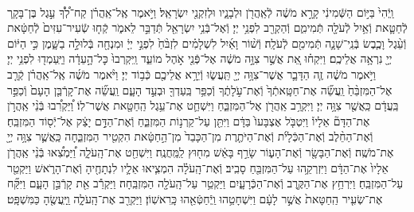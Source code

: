 \documentclass[twoside, openany, parskip=half, 11pt]{book}
\begin{document}
\begin{footnotesize}
\begin{multicols}{2}
\\
וַֽיְֿהִי֙ בַּיּ֣וֹם הַשְּֿׁמִינִ֔י קָרָ֣א מֹשֶׁ֔ה לְֿאַֽהֲרֹ֖ן וּלְבָנָ֑יו וּלְזִקְנֵ֖י יִשְׂרָאֵֽל׃ וַיֹּ֣אמֶר אֶֽל־אַֽהֲרֹ֗ן קַח־לְ֠ךָ֠ עֵ֣גֶל בֶּן־בָּקָ֧ר לְֿחַטָּ֛את וְֿאַ֥יִל לְֿעֹלָ֖ה תְּֿמִימִ֑ם וְֿהַקְרֵ֖ב לִפְנֵ֥י יְיָ׃ וְֿאֶל־בְּֿנֵ֥י יִשְׂרָאֵ֖ל תְּֿדַבֵּ֣ר לֵאמֹ֑ר קְֿח֤וּ שְֿׂעִיר־עִזִּים֙ לְֿחַטָּ֔את וְֿעֵ֨גֶל וָכֶ֧בֶשׂ בְּֿנֵֽי־שָׁנָ֛ה תְּֿמִימִ֖ם לְֿעֹלָֽה׃ וְֿשׁ֨וֹר וָאַ֜יִל לִשְׁלָמִ֗ים לִזְבֹּ֨חַ֙ לִפְנֵ֣י יְיָ֔ וּמִנְחָ֖ה בְּֿלוּלָ֣ה בַשָּׁ֑מֶן כִּ֣י הַיּ֔וֹם יְיָ֖ נִרְאָ֥ה אֲלֵיכֶֽם׃ וַיִּקְח֗וּ אֵ֚ת אֲשֶׁ֣ר צִוָּ֣ה מֹשֶׁ֔ה אֶל־פְּֿנֵ֖י אֹ֣הֶל מוֹעֵ֑ד וַֽיִּקְרְבוּ֙ כׇּל־הָ֣עֵדָ֔ה וַיַּֽעַמְד֖וּ לִפְנֵ֥י יְיָ׃ וַיֹּ֣אמֶר מֹשֶׁ֔ה זֶ֧ה הַדָּבָ֛ר אֲשֶׁר־צִוָּ֥ה יְיָ֖ תַּֽעֲשׂ֑וּ וְֿיֵרָ֥א אֲלֵיכֶ֖ם כְּֿב֥וֹד יְיָ׃  וַיֹּ֨אמֶר מֹשֶׁ֜ה אֶֽל־אַֽהֲרֹ֗ן קְֿרַ֤ב אֶל־הַמִּזְבֵּ֨חַ֙ וַֽעֲשֵׂ֞ה אֶת־חַטָּֽאתְֿךָ֙ וְֿאֶת־עֹ֣לָתֶ֔ךָ וְֿכַפֵּ֥ר בַּֽעַדְךָ֖ וּבְעַ֣ד הָעָ֑ם וַֽעֲשֵׂ֞ה אֶת־קָרְֿבַּ֤ן הָעָם֙ וְֿכַפֵּ֣ר בַּֽעֲדָ֔ם כַּֽאֲשֶׁ֖ר צִוָּ֥ה יְיָ׃ וַיִּקְרַ֥ב אַֽהֲרֹ֖ן אֶל־הַמִּזְבֵּ֑חַ וַיִּשְׁחַ֛ט אֶת־עֵ֥גֶל הַֽחַטָּ֖את אֲשֶׁר־לֽוֹ׃ וַ֠יַּקְרִ֠בוּ בְּֿנֵ֨י אַֽהֲרֹ֣ן אֶת־הַדָּם֘ אֵלָיו֒ וַיִּטְבֹּ֤ל אֶצְבָּעוֹ֙ בַּדָּ֔ם וַיִּתֵּ֖ן עַל־קַרְנ֣וֹת הַמִּזְבֵּ֑חַ וְֿאֶת־הַדָּ֣ם יָצַ֔ק אֶל־יְֿס֖וֹד הַמִּזְבֵּֽחַ׃ וְֿאֶת־הַחֵ֨לֶב וְֿאֶת־הַכְּֿלָיֹ֜ת וְֿאֶת־הַיֹּתֶ֤רֶת מִן־הַכָּבֵד֙ מִן־הַ֣חַטָּ֔את הִקְטִ֖יר הַמִּזְבֵּ֑חָה כַּֽאֲשֶׁ֛ר צִוָּ֥ה יְיָ֖ אֶת־מֹשֶֽׁה׃  וְֿאֶת־הַבָּשָׂ֖ר וְֿאֶת־הָע֑וֹר שָׂרַ֣ף בָּאֵ֔שׁ מִח֖וּץ לַֽמַּֽחֲנֶֽה׃ וַיִּשְׁחַ֖ט אֶת־הָֽעֹלָ֑ה וַ֠יַּמְצִ֠אוּ בְּֿנֵ֨י אַֽהֲרֹ֤ן אֵלָיו֙ אֶת־הַדָּ֔ם וַיִּזְרְקֵ֥הוּ עַל־הַמִּזְבֵּ֖חַ סָבִֽיב׃ וְֿאֶת־הָֽעֹלָ֗ה הִמְצִ֧יאוּ אֵלָ֛יו לִנְתָחֶ֖יהָ וְֿאֶת־הָרֹ֑אשׁ וַיַּקְטֵ֖ר עַל־הַמִּזְבֵּֽחַ׃ וַיִּרְחַ֥ץ אֶת־הַקֶּ֖רֶב וְֿאֶת־הַכְּֿרָעָ֑יִם וַיַּקְטֵ֥ר עַל־הָֽעֹלָ֖ה הַמִּזְבֵּֽחָה׃ וַיַּקְרֵ֕ב אֵ֖ת קָרְֿבַּ֣ן הָעָ֑ם וַיִּקַּ֞ח אֶת־שְׂעִ֤יר הַֽחַטָּאת֙ אֲשֶׁ֣ר לָעָ֔ם וַיִּשְׁחָטֵ֥הוּ וַֽיְֿחַטְּֿאֵ֖הוּ כָּֽרִאשֽׁוֹן׃ וַיַּקְרֵ֖ב אֶת־הָֽעֹלָ֑ה וַֽיַּֽעֲשֶׂ֖הָ כַּמִּשְׁפָּֽט׃


\end{multicols}
\end{footnotesize}
\end{document}
